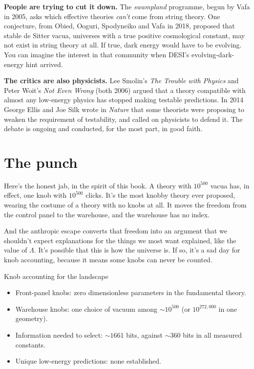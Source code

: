 \textbf{People are trying to cut it down.} The \emph{swampland} programme, begun by Vafa in 2005, asks which effective theories \emph{can't} come from string theory. One conjecture, from Obied, Ooguri, Spodyneiko and Vafa in 2018, proposed that stable de Sitter vacua, universes with a true positive cosmological constant, may not exist in string theory at all. If true, dark energy would have to be evolving. You can imagine the interest in that community when DESI's evolving-dark-energy hint arrived.

\textbf{The critics are also physicists.} Lee Smolin's \emph{The Trouble with Physics} and Peter Woit's \emph{Not Even Wrong} (both 2006) argued that a theory compatible with almost any low-energy physics has stopped making testable predictions. In 2014 George Ellis and Joe Silk wrote in \emph{Nature} that some theorists were proposing to weaken the requirement of testability, and called on physicists to defend it. The debate is ongoing and conducted, for the most part, in good faith.

\section{The punch}

Here's the honest jab, in the spirit of this book. A theory with $10^{500}$ vacua has, in effect, one knob with $10^{500}$ clicks. It's the most knobby theory ever proposed, wearing the costume of a theory with no knobs at all. It moves the freedom from the control panel to the warehouse, and the warehouse has no index.

And the anthropic escape converts that freedom into an argument that we shouldn't expect explanations for the things we most want explained, like the value of $\Lambda$. It's possible that this is how the universe is. If so, it's a sad day for knob accounting, because it means some knobs can never be counted.

\begin{knobbox}{Knob accounting for the landscape}
\begin{itemize}
\item Front-panel knobs: zero dimensionless parameters in the fundamental theory.
\item Warehouse knobs: one choice of vacuum among $\sim10^{500}$ (or $10^{272{,}000}$ in one geometry).
\item Information needed to select: $\sim1661$ bits, against $\sim360$ bits in all measured constants.
\item Unique low-energy predictions: none established.
\end{itemize}
\end{knobbox}

